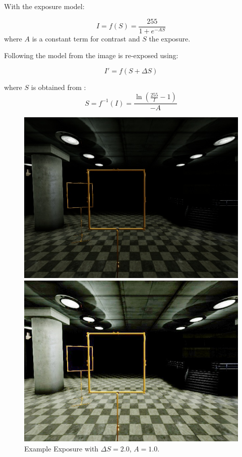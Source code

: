 With the exposure model:
 
\begin{equation}
 I = f(S) = \frac{255}{1 + e^{-A S}}
\end{equation}
where $A$ is a constant term for contrast and $S$ the exposure.

Following the model from \cite{Carlson2018} the image is re-exposed using:

\begin{equation}
	I' = f(S+\Delta S)
\end{equation}

where $S$ is obtained from :
\begin{equation}
S = f^{-1}(I) = \frac{\ln(\frac{255}{I}-1)}{-A}
\end{equation}

\begin{figure}[htbp]
	\centering
	\begin{minipage}{0.49\textwidth}
		\includegraphics[width=\textwidth]{fig/gate_example}
	\end{minipage}
	\begin{minipage}{0.49\textwidth}
		\includegraphics[width=\textwidth]{fig/gate_example_exposure}
	\end{minipage}
	\caption{Example Exposure with $\Delta S = 2.0$, $A = 1.0$.}
	\label{fig:exposure}
\end{figure}

